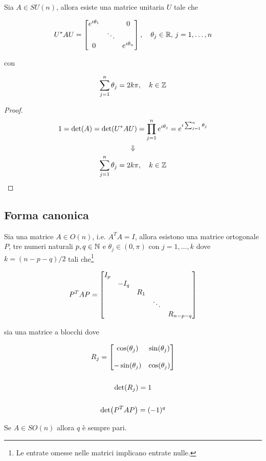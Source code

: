 \begin{corollary}[4]
	Sia $ A \in SU(n) $, allora esiste una matrice unitaria $ U $ tale che
	
	\begin{equation}
		U^{*} A U = %
		\bmqty{ %
				\dmat{ %
						e^{i \theta_{1}} & & 0 \\
						& \ddots & \\
						0 & & e^{i \theta_{n}} %
						}
				} %
		\qcomma \theta_{j} \in \R, \, j=1,\dots,n
	\end{equation}

	con
	
	\begin{equation}
		\sum_{j=1}^{n} \theta_{j} = 2 k \pi \qcomma k \in \Z
	\end{equation}
\end{corollary}

\begin{proof}
	\begin{gather}
		1 = \det(A) = \det(U^{*} A U) = \prod_{j=1}^{n} e^{i \theta_{j}} = e^{i \sum_{j=1}^{n} \theta_{j}} \\
		\Downarrow \nonumber \\
		\sum_{j=1}^{n} \theta_{j} = 2 k \pi \qcomma k \in \Z
	\end{gather}
\end{proof}

\subsection{Forma canonica}

\begin{theorem}
	Sia una matrice $ A \in O(n) $, i.e. $ A^{T} A = I $, allora esistono una matrice ortogonale $ P $, tre numeri naturali $ p,q \in \mathbb{N} $ e $ \theta_{j} \in (0,\pi) $ con $ j=1,\dots,k $ dove $ k = (n-p-q)/2 $ tali che\footnote{%
		Le entrate omesse nelle matrici implicano entrate nulle.%
	}

	\begin{equation}
		P^{T} A P = %
		\bmqty{ %
				\dmat{ %
					I_{p}, - I_{q}, R_{1}, \ddots, R_{n-p-q} %
					}
				}
	\end{equation}

	sia una matrice a blocchi dove
	
	\begin{gather}
		R_{j} = %
		\bmqty{ %
				\cos(\theta_{j}) & \sin(\theta_{j}) \\\\
				- \sin(\theta_{j}) & \cos(\theta_{j}) %
				 } \\
		\nonumber \\
		\det(R_{j}) = 1 \\
		\nonumber \\
		\det(P^{T} A P) = (- 1)^{q}
	\end{gather}

	Se $ A \in SO(n) $ allora $ q $ è sempre pari.
\end{theorem}

